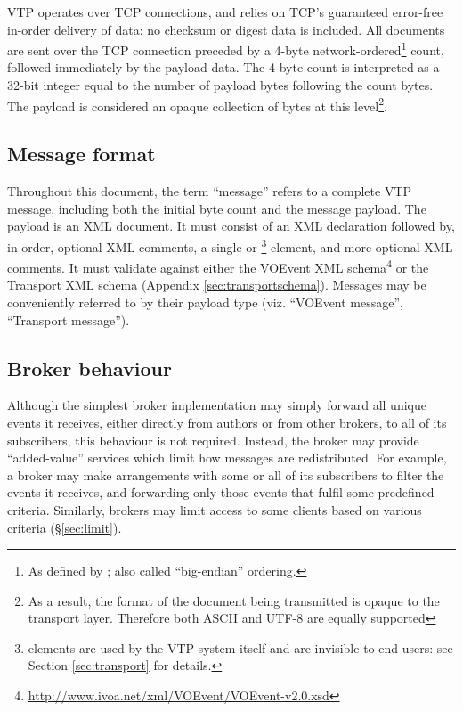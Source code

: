 \documentclass[a4paper,11pt]{ivoa}
\begin{document}
VTP operates over TCP \citep{Cerf:1974} connections, and relies on TCP's
guaranteed error-free in-order delivery of data: no checksum or digest data is
included. All documents are sent over the TCP connection preceded by a 4-byte
network-ordered\footnote{As defined by \citet{Reynolds:1994}; also called
``big-endian'' ordering.} count, followed immediately by the payload data. The
4-byte count is interpreted as a 32-bit integer equal to the number of payload
bytes following the count bytes. The payload is considered an opaque
collection of bytes at this level\footnote{As a result, the format of the
document being transmitted is opaque to the transport layer. Therefore both
ASCII and UTF-8 are equally supported}.

\subsection{Message format}
\label{sec:common:format}

Throughout this document, the term ``message'' refers to a complete VTP
message, including both the initial byte count and the message payload.  The
payload is an XML document. It must consist of an XML declaration followed by,
in order, optional XML comments, a single  or
\footnote{  elements are used by
the VTP system itself and are invisible to end-users: see Section
\ref{sec:transport} for details.} element, and more optional XML comments. It
must validate against either the VOEvent XML
schema\footnote{\url{http://www.ivoa.net/xml/VOEvent/VOEvent-v2.0.xsd}} or the
Transport XML schema (Appendix \ref{sec:transportschema}). Messages may be
conveniently referred to by their payload type (viz. ``VOEvent message'',
``Transport message'').

\subsection{Broker behaviour}
\label{sec:common:broker}

Although the simplest broker implementation may simply forward all unique
events it receives, either directly from authors or from other brokers, to all
of its subscribers, this behaviour is not required. Instead, the broker may
provide ``added-value'' services which limit how messages are redistributed.
For example, a broker may make arrangements with some or all of its
subscribers to filter the events it receives, and forwarding only those events
that fulfil some predefined criteria. Similarly, brokers may limit access to
some clients based on various criteria (\S\ref{sec:limit}).
\end{document}
